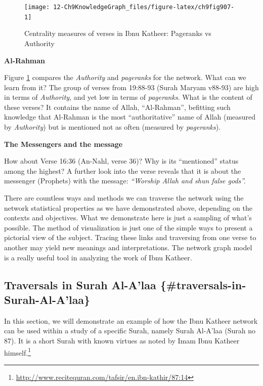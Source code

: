 \documentclass[
]{article}
\begin{document}
\begin{figure}

{\centering \texttt{[image: 12-Ch9KnowledgeGraph\_files/figure-latex/ch9fig907-1]} 

}

\caption{Centrality measures of verses in Ibnu Katheer: Pageranks vs Authority}\label{fig:ch9fig907}
\end{figure}

\textbf{Al-Rahman}

Figure \ref{fig:ch9fig907} compares the \emph{Authority} and \emph{pageranks} for the network. What can we learn from it? The group of verses from 19:88-93 (Surah Maryam v88-93) are high in terms of \emph{Authority}, and yet low in terms of \emph{pageranks}. What is the content of these verses? It contains the name of Allah, ``Al-Rahman'', befitting such knowledge that Al-Rahman is the most ``authoritative'' name of Allah (measured by \emph{Authority}) but is mentioned not as often (measured by \emph{pageranks}).

\textbf{The Messengers and the message}

How about Verse 16:36 (An-Nahl, verse 36)? Why is its ``mentioned'' status among the highest? A further look into the verse reveals that it is about the messenger (Prophets) with the message: \emph{``Worship Allah and shun false gods''.}

There are countless ways and methods we can traverse the network using the network statistical properties as we have demonstrated above, depending on the contexts and objectives. What we demonstrate here is just a sampling of what's possible. The method of visualization is just one of the simple ways to present a pictorial view of the subject. Tracing these links and traversing from one verse to another may yield new meanings and interpretations. The network graph model is a really useful tool in analyzing the work of Ibnu Katheer.

\hypertarget{traversals-in-surah-al-alaa-traversals-in-surah-al-alaa}{%
\subsection{Traversals in Surah Al-A'laa \{\#traversals-in-Surah-Al-A'laa\}}\label{traversals-in-surah-al-alaa-traversals-in-surah-al-alaa}}

In this section, we will demonstrate an example of how the Ibnu Katheer network can be used within a study of a specific Surah, namely Surah Al-A'laa (Surah no 87). It is a short Surah with known virtues as noted by Imam Ibnu Katheer himself.\footnote{\url{http://www.recitequran.com/tafsir/en.ibn-kathir/87:14}}
\end{document}

